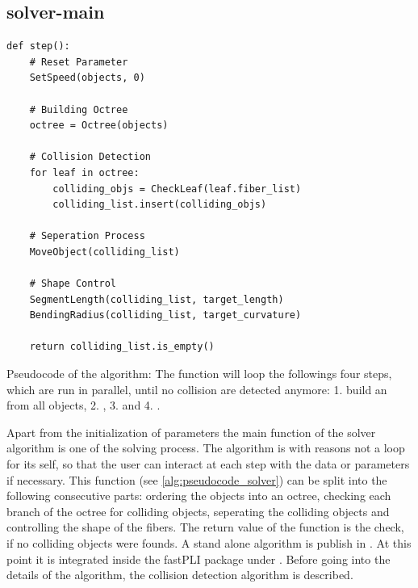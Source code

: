 \subsection{solver-main}
% 
\begin{lstfloat}[!tb]
\lstset{style=python}
\begin{lstlisting}[]
def step():
    # Reset Parameter
    SetSpeed(objects, 0)
    
    # Building Octree
    octree = Octree(objects)
    
    # Collision Detection
    for leaf in octree:
        colliding_objs = CheckLeaf(leaf.fiber_list)
        colliding_list.insert(colliding_objs)
	
    # Seperation Process
    MoveObject(colliding_list)
	
    # Shape Control
    SegmentLength(colliding_list, target_length)
    BendingRadius(colliding_list, target_curvature)

    return colliding_list.is_empty()
\end{lstlisting}
\caption{Pseudocode of the  algorithm: The function  will loop the followings four steps, which are run in parallel, until no collision are detected anymore: 1. build an  from all objects, 2. , 3.  and 4. . }
\label{alg:pseudocode_solver}
\end{lstfloat}
% 
Apart from the initialization of parameters the main function of the solver algorithm is one  of the solving process.
The algorithm is with reasons not a loop for its self, so that the user can interact at each step with the data or parameters if necessary.
This  function (see \cref{alg:pseudocode_solver}) can be split into the following consecutive parts:
ordering the objects into an octree, checking each branch of the octree for colliding objects, seperating the colliding objects and controlling the shape of the fibers.
The return value of the function is the check, if no colliding objects were founds.
%
A stand alone algorithm is publish in \cite{Matuschke2019}.
At this point it is integrated inside the \ac{fastPLI} package under .
Before going into the details of the algorithm, the collision detection algorithm is described.
% 
% 
% 
